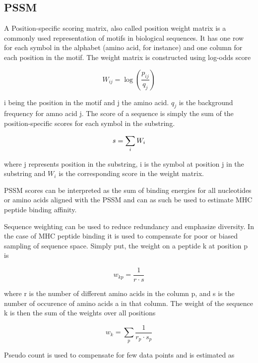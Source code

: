 
\subsection*{PSSM}
A Position-specific scoring matrix, also called position weight matrix is a commonly used representation of motifs in biological sequences. 
It has one row for each symbol in the alphabet (amino acid, for instance) and one column for each position in the motif.
The weight matrix is constructed using log-odds score

\begin{equation}
W_{ij} = \log{ (\frac{p_{ij}}{q_j}) }
\end{equation}

i being the position in the motif and j the amino acid. $q_j$ is the background frequency for amno acid j. 
The score of a sequence is simply the sum of the position-specific scores for each symbol in the substring.

\begin{equation}
s = \sum_{i}{W_{i}} \\
\end{equation}

where j represents position in the substring, i is the symbol at position j in the substring and $W_{i}$ is the corresponding score in the weight matrix.

PSSM scores can be interpreted as the sum of binding energies for all nucleotides or amino acids aligned with the PSSM and can as such be used to estimate MHC peptide binding affinity.

Sequence weighting can be used to reduce redundancy and emphasize diversity. In the case of MHC peptide binding it is used to compensate for poor or biased sampling of sequence space.
Simply put, the weight on a peptide k at position p is

\begin{equation}
w_{kp} = \frac{1}{r\cdot s}
\end{equation}

where r is the number of different amino acids in the column p, and s is the number of occurence of amino acids a in that column. The weight of the sequence k is then the sum of the weights over all positions

\begin{equation}
w_{k} = \sum_{p}{\frac{1}{r_p \cdot s_p}}
\end{equation}

Pseudo count is used to compensate for few data points and is estimated as

